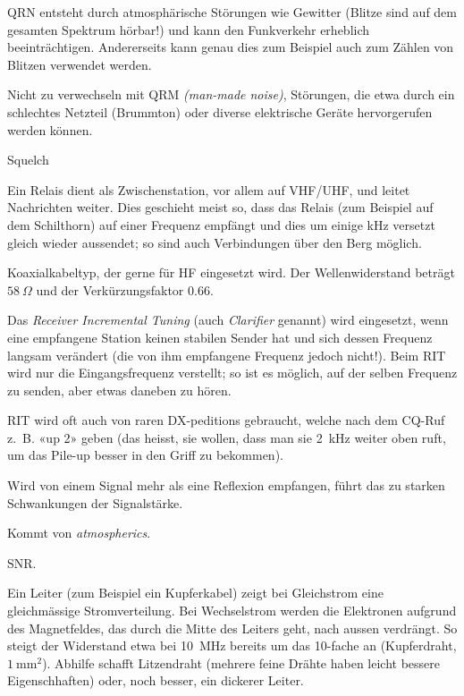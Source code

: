 {QRN entsteht durch atmosphärische Störungen wie Gewitter (Blitze sind auf dem gesamten Spektrum hörbar!) und kann den Funkverkehr erheblich beeinträchtigen. Andererseits kann genau dies zum Beispiel auch zum Zählen von Blitzen verwendet werden.

Nicht zu verwechseln mit QRM \textit{(man-made noise)}, Störungen, die etwa durch ein schlechtes Netzteil (Brummton) oder diverse elektrische Geräte hervorgerufen werden können.}

{}

{Squelch}

{Ein Relais dient als Zwischenstation, vor allem auf VHF/UHF, und leitet Nachrichten weiter. Dies geschieht meist so, dass das Relais (zum Beispiel auf dem Schilthorn) auf einer Frequenz empfängt und dies um einige kHz versetzt gleich wieder aussendet; so sind auch Verbindungen über den Berg möglich.}

{Koaxialkabeltyp, der gerne für HF eingesetzt wird. Der Wellenwiderstand beträgt $58~\Omega$ und der Verkürzungsfaktor 0.66.}

{Das \textit{Receiver Incremental Tuning} (auch \textit{Clarifier} genannt) wird eingesetzt, wenn eine empfangene Station keinen stabilen Sender hat und sich dessen Frequenz langsam verändert (die von ihm empfangene Frequenz jedoch nicht!). Beim RIT wird nur die Eingangsfrequenz verstellt; so ist es möglich, auf der selben Frequenz zu senden, aber etwas daneben zu hören.

RIT wird oft auch von raren DX-peditions gebraucht, welche nach dem CQ-Ruf z. B. «up 2» geben (das heisst, sie wollen, dass man sie 2 kHz weiter oben ruft, um das Pile-up besser in
den Griff zu bekommen).}

{Wird von einem Signal mehr als eine Reflexion empfangen, führt das zu starken Schwankungen der Signalstärke.}

{Kommt von \textit{atmospherics}. }

{SNR. }

{Ein Leiter (zum Beispiel ein Kupferkabel) zeigt bei Gleichstrom eine gleichmässige Stromverteilung. Bei Wechselstrom werden die Elektronen aufgrund des Magnetfeldes, das durch die Mitte des Leiters geht, nach aussen verdrängt. So steigt der Widerstand etwa bei 10 MHz bereits um das 10-fache an (Kupferdraht, $1~\mathrm{mm}^2$). Abhilfe schafft Litzendraht (mehrere feine Drähte haben leicht bessere Eigenschhaften) oder, noch besser, ein dickerer Leiter.}

